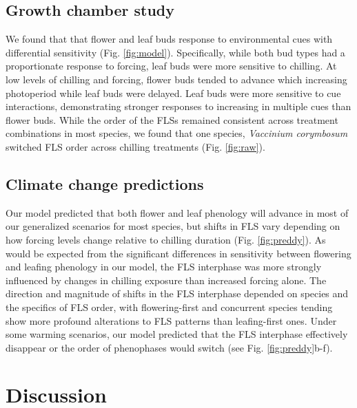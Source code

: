 \documentclass[11pt]{article}
\begin{document}
\subsection*{Growth chamber study}
\noindent We found that that flower and leaf buds response to environmental cues with differential sensitivity (Fig. \ref{fig:model}). Specifically, while both bud types had a proportionate response to forcing, leaf buds were more sensitive to chilling. At low levels of chilling and forcing, flower buds tended to advance which increasing photoperiod while leaf buds were delayed. Leaf buds were more sensitive to cue interactions, demonstrating stronger responses to increasing in multiple cues than flower buds. While the order of the FLSs remained consistent across treatment combinations in most species, we found that one species, \textit{Vaccinium corymbosum} switched FLS order across chilling treatments (Fig. \ref{fig:raw}). 

\subsection*{Climate change predictions}
\noindent Our model predicted that both flower and leaf phenology will advance in most of our generalized scenarios for most species, but shifts in FLS vary depending on how forcing levels change relative to chilling duration (Fig. \ref{fig:preddy}). As would be expected from the significant differences in sensitivity between flowering and leafing phenology in our model, the FLS interphase was more strongly influenced by changes in chilling exposure than increased forcing alone. The direction and magnitude of shifts in the FLS interphase depended on species and the specifics of FLS order, with flowering-first and concurrent species tending show more profound alterations to FLS patterns than leafing-first ones. Under some warming scenarios, our model predicted that the FLS interphase effectively disappear or the order of phenophases would switch (see Fig. \ref{fig:preddy}b-f).

\section*{Discussion}
\end{document}
